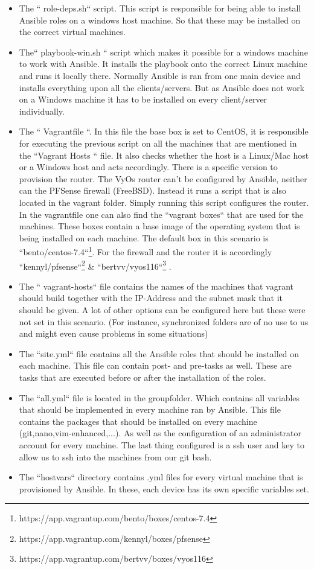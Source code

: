 \begin{itemize}
\item The `` role-deps.sh`` script. This script is responsible for being able to install Ansible roles on a windows host machine. So that these may be installed on the correct virtual machines.
\item The`` playbook-win.sh `` script which makes it possible for a windows machine to work with Ansible. It installs the playbook onto the correct Linux machine and runs it locally there. Normally Ansible is ran from one main device and installs everything upon all the clients/servers. But as Ansible does not work on a Windows machine it has to be installed on every client/server individually.
\item The `` Vagrantfile ``. In this file the base box is set to CentOS, it is responsible for executing the previous script on all the machines that are mentioned in the ``Vagrant Hosts `` file. It also checks whether the host is a Linux/Mac host or a Windows host and acts accordingly. There is a specific version to provision the router. The VyOs router can't be configured by Ansible, neither can the PFSense firewall (FreeBSD). Instead it runs a script that is also located in the vagrant folder. Simply running this script configures the router. In the vagrantfile one can also find the ``vagrant boxes`` that are used for the machines. These boxes contain a base image of the operating system that is being installed on each machine. The default box in this scenario is ``bento/centos-7.4``\footnote{https://app.vagrantup.com/bento/boxes/centos-7.4}. For the firewall and the router it is accordingly ``kennyl/pfsense``\footnote{https://app.vagrantup.com/kennyl/boxes/pfsense} \& ``bertvv/vyos116``\footnote{https://app.vagrantup.com/bertvv/boxes/vyos116} .
\item The `` vagrant-hosts`` file contains the names of the machines that vagrant should build together with the IP-Address and the subnet mask that it should be given. A lot of other options can be configured here but these were not set in this scenario. (For instance, synchronized folders are of no use to us and might even cause problems in some situations)
\item The ``site.yml`` file contains all the Ansible roles that should be installed on each machine. This file can contain post- and pre-tasks as well. These are tasks that are executed before or after the installation of the roles.
\item The ``all.yml`` file is located in the group\textunderscore folder. Which contains all variables that should be implemented in every machine ran by Ansible. This file contains the packages that should be installed on every machine (git,nano,vim-enhanced,...). As well as the configuration of an administrator account for every machine. The last thing configured is a ssh user and key to allow us to ssh into the machines from our git bash. 
\item The ``host\textunderscore vars`` directory contains .yml files for every virtual machine that is provisioned by Ansible. In these, each device has its own specific variables set.
\end {itemize}

